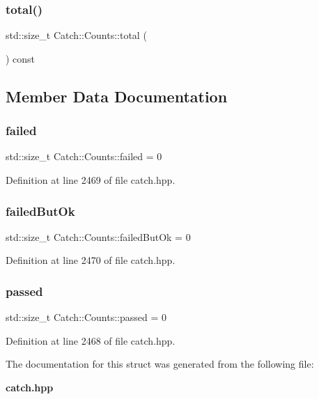 \subsubsection{total()}
{\footnotesize\ttfamily std\+::size\+\_\+t Catch\+::\+Counts\+::total (\begin{DoxyParamCaption}{ }\end{DoxyParamCaption}) const}



\subsection{Member Data Documentation}
\mbox{\label{struct_catch_1_1_counts_a19982a3817a3bc2c07f0290e71f497a3}} 
\subsubsection{failed}
{\footnotesize\ttfamily std\+::size\+\_\+t Catch\+::\+Counts\+::failed = 0}



Definition at line 2469 of file catch.\+hpp.

\mbox{\label{struct_catch_1_1_counts_ac090973a2ff51394cd452718e75c073e}} 
\subsubsection{failedButOk}
{\footnotesize\ttfamily std\+::size\+\_\+t Catch\+::\+Counts\+::failed\+But\+Ok = 0}



Definition at line 2470 of file catch.\+hpp.

\mbox{\label{struct_catch_1_1_counts_ad28daaf3de28006400208b6dd0c631e6}} 
\subsubsection{passed}
{\footnotesize\ttfamily std\+::size\+\_\+t Catch\+::\+Counts\+::passed = 0}



Definition at line 2468 of file catch.\+hpp.



The documentation for this struct was generated from the following file\+:\begin{DoxyCompactItemize}
\item 
\textbf{ catch.\+hpp}\end{DoxyCompactItemize}
